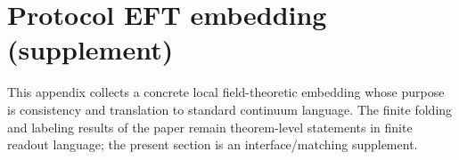 \section{Protocol EFT embedding (supplement)}
\label{app:protocol_eft_embedding}

This appendix collects a concrete local field-theoretic embedding whose purpose is consistency and translation to standard continuum language.
The finite folding and labeling results of the paper remain theorem-level statements in finite readout language; the present section is an interface/matching supplement.




